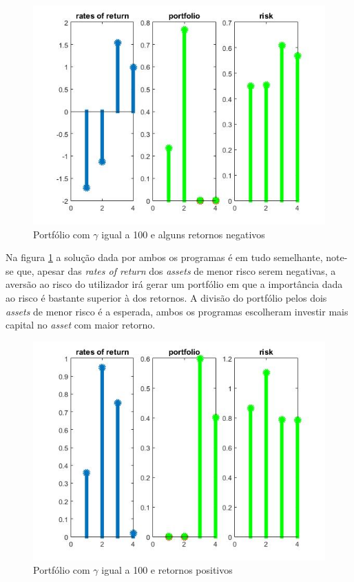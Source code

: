 \documentclass[a4paper]{IEEEtran}
\begin{document}
\begin{itemize}
\begin{figure}[htp]
\captionsetup{font=scriptsize}  
  \centering
  \includegraphics[width=0.9\columnwidth]{./gama_100}
  \caption{Portfólio com $\gamma$ igual a 100 e alguns retornos negativos}
  \label{fig:caso2.1}
\end{figure}

Na figura \ref{fig:caso2.1} a solução dada por ambos os programas é em tudo semelhante, note-se que, apesar das \textit{rates of return} dos \textit{assets} de menor risco serem negativas, a aversão ao risco do utilizador irá gerar um portfólio em que a importância dada ao risco é bastante superior à dos retornos. A divisão do portfólio pelos dois \textit{assets} de menor risco é a esperada, ambos os programas \: escolheram investir mais capital no \textit{asset} com maior retorno.


\begin{figure}[htp]
\captionsetup{font=scriptsize}  
  \centering
  \includegraphics[width=0.9\columnwidth]{./gama_100_positivos}
  \caption{Portfólio com $\gamma$ igual a 100 e retornos positivos}
  \label{fig:caso2.2}
\end{figure}


\end{itemize}
\end{document}
